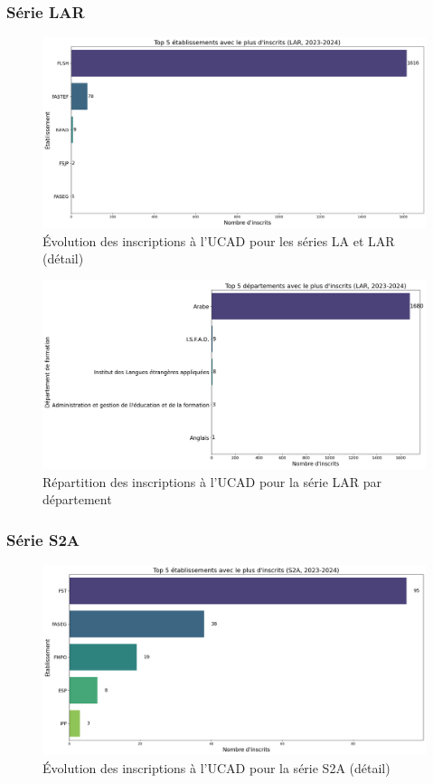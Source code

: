 \newpage
\subsubsection{Série LAR}

\begin{figure}[h]
\centering
\caption{Évolution des inscriptions à l'UCAD pour les séries LA et LAR (détail)}
\includegraphics[width=1\textwidth]{figure/etab_LAR_2024.png}
\end{figure}

\begin{figure}[h]
\centering
\caption{Répartition des inscriptions à l'UCAD pour la série LAR par département}
\includegraphics[width=1\textwidth]{figure/dep_LAR_2024.png}
\end{figure}

\newpage
\subsubsection{Série S2A}

\begin{figure}[h]
\centering
\caption{Évolution des inscriptions à l'UCAD pour la série S2A (détail)}
\includegraphics[width=1\textwidth]{figure/etab_S2A_2024.png}
\end{figure}

